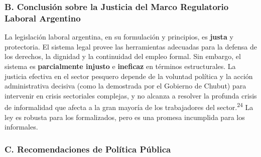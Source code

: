 \documentclass[]{article}
\begin{document}
\hypertarget{b.-conclusiuxf3n-sobre-la-justicia-del-marco-regulatorio-laboral-argentino}{%
\subsubsection{B. Conclusión sobre la Justicia del Marco Regulatorio
Laboral
Argentino}\label{b.-conclusiuxf3n-sobre-la-justicia-del-marco-regulatorio-laboral-argentino}}

La legislación laboral argentina, en su formulación y principios, es
\textbf{justa} y protectoria. El sistema legal provee las herramientas
adecuadas para la defensa de los derechos, la dignidad y la continuidad
del empleo formal. Sin embargo, el sistema es \textbf{parcialmente
injusto} e \textbf{ineficaz} en términos estructurales. La justicia
efectiva en el sector pesquero depende de la voluntad política y la
acción administrativa decisiva (como la demostrada por el Gobierno de
Chubut) para intervenir en crisis sectoriales complejas, y no alcanza a
resolver la profunda crisis de informalidad que afecta a la gran mayoría
de los trabajadores del sector.\textsuperscript{24} La ley es robusta
para los formalizados, pero es una promesa incumplida para los
informales.

\hypertarget{c.-recomendaciones-de-poluxedtica-puxfablica}{%
\subsubsection{C. Recomendaciones de Política
Pública}\label{c.-recomendaciones-de-poluxedtica-puxfablica}}
\end{document}

